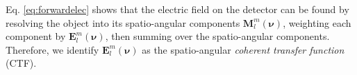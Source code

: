 \documentclass[11pt]{article}
\newcommand{\me}{\mathrm{e}}
\providecommand{\mb}[1]{\mathbf{#1}}
\providecommand{\ro}[1]{\mathbf{\mathbf{r}}_o}
\providecommand{\so}[1]{\mathbf{\hat{s}}_o}
\providecommand{\rd}[1]{\mathbf{r}_d}
\providecommand{\bs}[1]{\boldsymbol{#1}}
\begin{document}
Eq. \ref{eq:forwardelec} shows that the electric field on the detector can be
found by resolving the object into its spatio-angular components
$\mb{M}_l^m(\bs{\nu})$, weighting each component by $\mb{E}_l^m(\bs{\nu})$, then
summing over the spatio-angular components. Therefore, we
identify $\mb{E}_l^m(\bs{\nu})$ as the spatio-angular \textit{coherent transfer
  function} (CTF).
\end{document}
